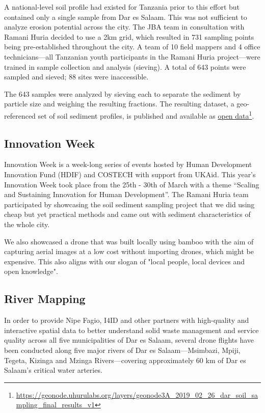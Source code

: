 \documentclass[a4paper,12pt,twoside]{article}
\begin{document}
\begin{multicols}{2}
A national-level soil profile had existed for Tanzania prior to this effort but contained only a single sample from Dar es Salaam. This was not sufficient to analyze erosion potential across the city. The JBA team in consultation with Ramani Huria decided to use a 2km grid, which resulted in 731 sampling points being pre-established throughout the city. A team of 10 field mappers and 4 office technicians—all Tanzanian youth participants in the Ramani Huria project—were trained in sample collection and analysis (sieving). A total of 643 points were sampled and sieved; 88 sites were inaccessible.


The 643 samples were analyzed by sieving each to separate the sediment by particle size and weighing the resulting fractions. The resulting dataset, a geo-referenced set of soil sediment profiles, is published and available as \href{https://geonode.uhurulabs.org/layers/geonode3A_2019_02_26_dar_soil_sampling_final_results_v1}{open data}\footnote{\url{https://geonode.uhurulabs.org/layers/geonode3A_2019_02_26_dar_soil_sampling_final_results_v1}}.

\subsection{Innovation Week}
Innovation Week is a week-long series of events hosted by Human Development Innovation Fund (HDIF) and COSTECH with support from UKAid. This year’s Innovation Week took place from the 25th - 30th of March with a theme “Scaling and Sustaining Innovation for Human Development”. The Ramani Huria team participated by showcasing the soil sediment sampling project that we did using cheap but yet practical methods and came out with sediment characteristics of the whole city.

We also showcased a drone that was built locally using bamboo with the aim of capturing aerial images at a low cost without importing drones, which might be expensive. This also aligns with our slogan of "local people, local devices and open knowledge".

\subsection{River Mapping}
In order to provide Nipe Fagio, I4ID and other partners with high-quality and interactive spatial data to better understand solid waste management and service quality across all five municipalities of Dar es Salaam, several drone flights have been conducted along five major rivers of Dar es Salaam---Msimbazi, Mpiji, Tegeta, Kizinga and Mzinga Rivers---covering approximately 60 km of Dar es Salaam’s critical water arteries. 


\end{multicols}
\end{document}
